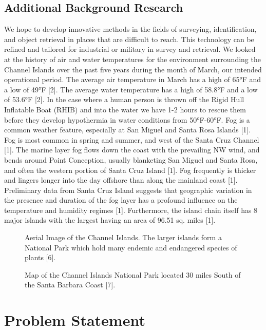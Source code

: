 \documentclass{wrcecapstone}
\begin{document}
\subsection{Additional Background Research}
We hope to develop innovative methods in the fields of surveying, identification, and object retrieval in places that are difficult to reach. This technology can be refined and tailored for industrial or military in survey and retrieval. 
We looked at the history of air and water temperatures for the environment surrounding the Channel Islands over the past five years during the month of March, our intended operational period. The average air temperature in March has a high of 65°F and a low of 49°F [2]. The average water temperature has a high of 58.8°F and a low of 53.6°F [2]. In the case where a human person is thrown off the Rigid Hull Inflatable Boat (RHIB) and into the water we have 1-2 hours to rescue them before they develop hypothermia in water conditions from 50°F-60°F. Fog is a common weather feature, especially at San Miguel and Santa Rosa Islands [1]. Fog is most common in spring and summer, and west of the Santa Cruz Channel [1]. The marine layer fog flows down the coast with the prevailing NW wind, and bends around Point Conception, usually blanketing San Miguel and Santa Rosa, and often the western portion of Santa Cruz Island [1]. Fog frequently is thicker and lingers longer into the day offshore than along the mainland coast [1]. Preliminary data from Santa Cruz Island suggests that geographic variation in the presence and duration of the fog layer has a profound influence on the temperature and humidity regimes [1]. Furthermore, the island chain itself has 8 major islands with the largest having an area of 96.51 sq. miles [1]. 
\begin{figure}
\caption{Aerial Image of the Channel Islands. The larger islands form a National Park which hold many endemic and endangered species of plants [6].}
\end{figure}

\begin{figure}
\caption{Map of the Channel Islands National Park located 30 miles South of the Santa Barbara Coast [7].}
\end{figure}






\section{Problem Statement}
\end{document}
